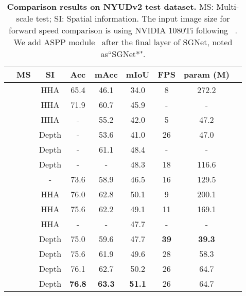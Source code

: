 \documentclass[journal]{IEEEtran}
\newcommand{\Yes}{\ding{51}}
\begin{document}
\begin{table*}[t]\normalsize
	\centering
	\renewcommand\tabcolsep{12pt}
	\caption{\textbf{Comparison results on NYUDv2 test dataset.} 
	  MS: Multi-scale test;
		SI: Spatial information. The input image size for forward speed comparison is 
		 using NVIDIA 1080Ti following ~\cite{dcnn}. We add ASPP module~\cite{deeplab}
		after the final layer of SGNet, noted as``SGNet*".}
	\label{tab:nyud1} \vspace{-7pt}
	\begin{tabular}{l || c c c| c c c c c}
		\toprule[1.5pt]
		\MthdN &MS  &  SI & Acc & mAcc& mIoU& FPS& param (M)\\ \hline\hline
		\FCN   &    & HHA & 65.4 & 46.1 & 34.0 &  8 &272.2\\
		\LSDGF &    & HHA & 71.9 & 60.7 & 45.9 &  - &-    \\
		\DGNN  &		& HHA &  -   & 55.2 & 42.0 & 5  &47.2 \\
		\DCNN  & & Depth & - &53.6 & 41.0 & 26 & 47.0\\
		\DCNNss  &    &Depth&  -   & 61.1 & 48.4 & - &- \\ 
		\ACNet &    &Depth&  -   &  -   & 48.3 & 18 &116.6\\
		\RefNt &\Yes&  -  & 73.6 & 58.9 & 46.5 & 16 &129.5\\
		\RDFNt &\Yes& HHA & 76.0 & 62.8 & 50.1 & 9  &200.1\\
		\RDFNtsmall &\Yes& HHA & 75.6 & 62.2 & 49.1 & 11  &169.1\\
		\CFNet &\Yes& HHA &  -   &  -   & 47.7 & -  & -   \\
		\hline
		\SGNetsmall &	& Depth & 75.0 & 59.6 & 47.7 & \textbf{39} &\textbf{39.3}\\
		\SGNet &        & Depth & 75.6 & 61.9 & 49.6 & 28 &58.3\\
		\SGNets&       & Depth & 76.1 & 62.7 & 50.2&  26 &64.7\\
		\SGNets&\Yes    & Depth & \textbf{76.8}&\textbf{63.3}&\textbf{51.1}& 26 &64.7\\
		\bottomrule[1.5pt]
	\end{tabular}
\end{table*}
\end{document}
